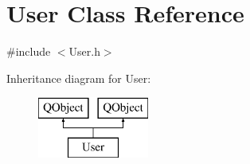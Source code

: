 \hypertarget{class_user}{\section{User Class Reference}
\label{class_user}
}


{\ttfamily \#include $<$User.\-h$>$}

Inheritance diagram for User\-:\begin{figure}[H]
\begin{center}
\leavevmode
\includegraphics[height=2.000000cm]{class_user}
\end{center}
\end{figure}
